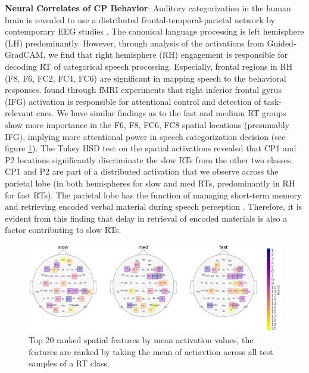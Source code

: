 \documentclass{article}
\begin{document}
\textbf{Neural Correlates of CP Behavior}: Auditory categorization in the human brain is revealed to use a distributed frontal-temporal-parietal network by contemporary EEG studies \cite{plasticity_sp, language_sp, Al_Fahad_2020}. The canonical language processing is left hemisphere (LH) predominantly. However, through analysis of the activations from Guided-GradCAM, we find that right hemisphere (RH) engagement is responsible for decoding RT of categorical speech processing. Especially, frontal regions in RH (F8, F6, FC2, FC4, FC6) are significant in mapping speech to the behavioral responses. \cite{RH_IFG1, RH_IFG2} found through fMRI experiments that right inferior frontal gyrus (IFG) activation is responsible for attentional control and detection of task-relevant cues. We have similar findings as to the fast and medium RT groups show more importance in the F6, F8, FC6, FC8 spatial locations (presumably IFG), implying more attentional power in speech categorization decision (see figure \ref{overall_sp_saliency}). The Tukey HSD test on the spatial activations revealed that CP1 and P2 locations significantly discriminate the slow RTs from the other two classes. CP1 and P2 are part of a distributed activation that we observe across the parietal lobe (in both hemispheres for slow and med RTs, predominantly in RH for fast RTs). The parietal lobe has the function of managing short-term memory and retrieving encoded verbal material during speech perception \cite{parietal}. Therefore, it is evident from this finding that delay in retrieval of encoded materials is also a factor contributing to slow RTs.

\begin{figure}[ht]
\vskip 0.2in
\begin{center}
\centerline{\includegraphics[width=\columnwidth]{Images/overall_class_discriminative_spatial_saliency}}
\caption[Ranked spatial features by activation values]{Top 20 ranked spatial features by mean activation values, the features are ranked by taking the mean of actiavtion across all test samples of a RT class. }
\end{center}
\vskip -0.2in
\label{overall_sp_saliency}
\end{figure}
\end{document}
